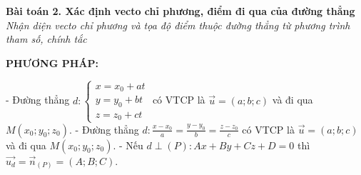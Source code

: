 \documentclass[12pt,a4paper]{article}
\newenvironment{lesson}[2]{
	\vspace{1em}\noindent\textbf{\Large #1}\\
	\textit{#2}\vspace{0.5em}
}{}
\begin{document}
\begin{lesson}{Bài toán 2. Xác định vecto chỉ phương, điểm đi qua của đường thẳng}{Nhận diện vecto chỉ phương và tọa độ điểm thuộc đường thẳng từ phương trình tham số, chính tắc}

\textbf{PHƯƠNG PHÁP:}

- Đường thẳng $d: \begin{cases} x = x_0 + at \\ y = y_0 + bt \\ z = z_0 + ct \end{cases}$ có VTCP là $\vec{u} = (a; b; c)$ và đi qua $M(x_0; y_0; z_0)$.
- Đường thẳng $d: \frac{x - x_0}{a} = \frac{y - y_0}{b} = \frac{z - z_0}{c}$ có VTCP là $\vec{u} = (a; b; c)$ và đi qua $M(x_0; y_0; z_0)$.
- Nếu $d \perp (P): Ax + By + Cz + D = 0$ thì $\vec{u_d} = \vec{n}_{(P)} = (A; B; C)$.

\end{lesson}
\end{document}
